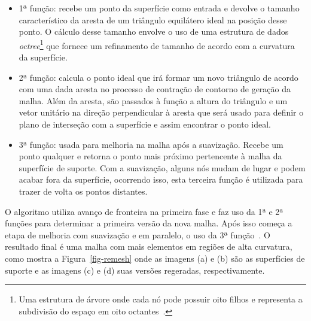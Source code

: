 \renewcommand{\labelitemi}{•}
\begin{itemize}
  \item 1ª função: recebe um ponto da superfície como entrada e devolve o tamanho característico da aresta de um triângulo equilátero ideal na posição desse ponto. O cálculo desse tamanho envolve o uso de uma estrutura de dados \textit{octree}\footnote{Uma estrutura de árvore onde cada nó pode possuir oito filhos e representa a subdivisão do espaço em oito octantes~\cite{Donald}.} que fornece um refinamento de tamanho de acordo com a curvatura da superfície.
  \item 2ª função: calcula o ponto ideal que irá formar um novo triângulo de acordo com uma dada aresta no processo de contração de contorno de geração da malha. Além da aresta, são passados à função a altura do triângulo e um vetor unitário na direção perpendicular à aresta que será usado para definir o plano de interseção com a superfície e assim encontrar o ponto ideal.
  \item 3ª função: usada para melhoria na malha após a suavização. Recebe um ponto qualquer e retorna o ponto mais próximo pertencente à malha da superfície de suporte. Com a suavização, alguns nós mudam de lugar e podem acabar fora da superfície, ocorrendo isso, esta terceira função é utilizada para trazer de volta os pontos distantes. 
\end{itemize}

O algoritmo utiliza avanço de fronteira na primeira fase e faz uso da 1ª e 2ª funções para determinar a primeira versão da nova malha. Após isso começa a etapa de melhoria com suavização e em paralelo, o uso da 3ª função~\cite{Miranda}. O resultado final é uma malha com mais elementos em regiões de alta curvatura, como mostra a Figura~\ref{fig-remesh} onde as imagens (a) e (b) são as superfícies de suporte e as imagens (c) e (d) suas versões regeradas, respectivamente.

